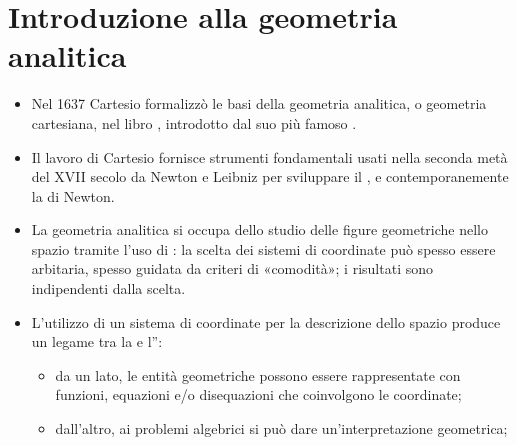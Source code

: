 \documentclass[letterpaper,10pt,italian]{jupyterBook}
\begin{document}
\chapter{Introduzione alla geometria analitica}
\label{\detokenize{ch/analytic_geometry:introduzione-alla-geometria-analitica}}\label{\detokenize{ch/analytic_geometry:geometry-analytic}}\label{\detokenize{ch/analytic_geometry::doc}}\begin{itemize}
\item {} 
\sphinxAtStartPar
Nel 1637 Cartesio formalizzò le basi della geometria analitica, o geometria cartesiana, nel libro , introdotto dal suo più famoso .

\item {} 
\sphinxAtStartPar
Il lavoro di Cartesio fornisce strumenti fondamentali usati nella seconda metà del XVII secolo da Newton e Leibniz per sviluppare il {\hyperref[\detokenize{ch/calculus:math-hs-calculus}]{}}, e contemporanemente la  di Newton.

\item {} 
\sphinxAtStartPar
La geometria analitica si occupa dello studio delle figure geometriche nello spazio tramite l’uso di : la scelta dei sistemi di coordinate può spesso essere arbitaria, spesso guidata da criteri di «comodità»; i risultati sono indipendenti dalla scelta.

\item {} 
\sphinxAtStartPar
L’utilizzo di un sistema di coordinate per la descrizione dello spazio produce un legame tra la  e l”:
\begin{itemize}
\item {} 
\sphinxAtStartPar
da un lato, le entità geometriche possono essere rappresentate con funzioni, equazioni e/o disequazioni che coinvolgono le coordinate;

\item {} 
\sphinxAtStartPar
dall’altro, ai problemi algebrici si può dare un’interpretazione geometrica;

\end{itemize}

\end{itemize}
\end{document}

